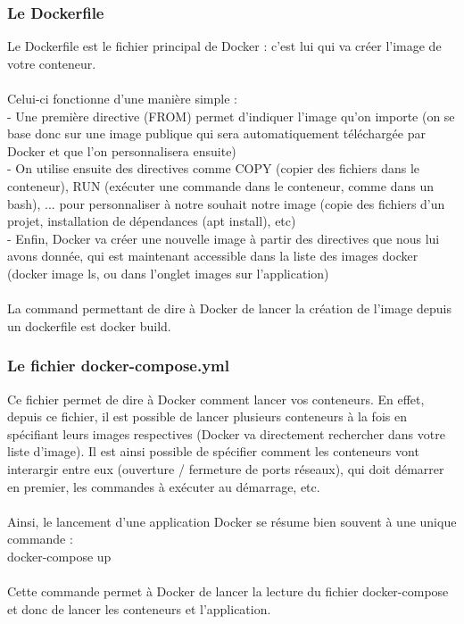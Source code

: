 \documentclass{article}
\begin{document}
    \subsubsection{Le Dockerfile}
    Le Dockerfile est le fichier principal de Docker : c'est lui qui va créer l'image de votre conteneur.\\ \\
    Celui-ci fonctionne d'une manière simple :\\
    \indent - Une première directive (FROM) permet d'indiquer l'image qu'on importe (on se base donc sur une image publique qui sera automatiquement téléchargée par Docker et que l'on personnalisera ensuite)\\
    \indent - On utilise ensuite des directives comme COPY (copier des fichiers dans le conteneur), RUN (exécuter une commande dans le conteneur, comme dans un bash), ... pour personnaliser à notre souhait notre image (copie des fichiers d'un projet, installation de dépendances (apt install), etc)\\
    \indent - Enfin, Docker va créer une nouvelle image à partir des directives que nous lui avons donnée, qui est maintenant accessible dans la liste des images docker (docker image ls, ou dans l'onglet images sur l'application)\\\\
    \indent La command permettant de dire à Docker de lancer la création de l'image depuis un dockerfile est docker build.

    \subsubsection{Le fichier docker-compose.yml}
    Ce fichier permet de dire à Docker comment lancer vos conteneurs. En effet, depuis ce fichier, il est possible de lancer plusieurs conteneurs à la fois en spécifiant leurs images respectives (Docker va directement rechercher dans votre liste d'image). Il est ainsi possible de spécifier comment les conteneurs vont interargir entre eux (ouverture / fermeture de ports réseaux), qui doit démarrer en premier, les commandes à exécuter au démarrage, etc.\\\\
    Ainsi, le lancement d'une application Docker se résume bien souvent à une unique commande : \\
    \indent docker-compose up\\\\
    Cette commande permet à Docker de lancer la lecture du fichier docker-compose et donc de lancer les conteneurs et l'application.
\end{document}
